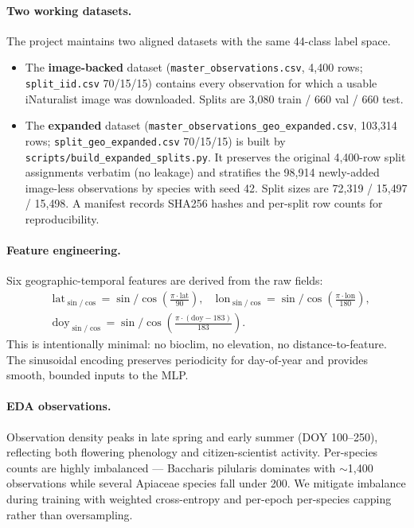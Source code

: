 \documentclass[11pt]{article}
\begin{document}
\paragraph{Two working datasets.} The project maintains two aligned datasets with the same 44-class label space.

\begin{itemize}
    \item The \textbf{image-backed} dataset (\texttt{master\_observations.csv}, 4{,}400 rows; \texttt{split\_iid.csv} 70/15/15) contains every observation for which a usable iNaturalist image was downloaded. Splits are 3{,}080 train / 660 val / 660 test.
    \item The \textbf{expanded} dataset (\texttt{master\_observations\_geo\_expanded.csv}, 103{,}314 rows; \texttt{split\_geo\_expanded.csv} 70/15/15) is built by \texttt{scripts/build\_expanded\_splits.py}. It preserves the original 4{,}400-row split assignments verbatim (no leakage) and stratifies the 98{,}914 newly-added image-less observations by species with seed 42. Split sizes are 72{,}319 / 15{,}497 / 15{,}498. A manifest records SHA256 hashes and per-split row counts for reproducibility.
\end{itemize}

\paragraph{Feature engineering.} Six geographic-temporal features are derived from the raw fields:
\[
\begin{aligned}
&\text{lat}_{\sin/\cos} = \sin/\cos\!\left(\tfrac{\pi \cdot \text{lat}}{90}\right), \quad
\text{lon}_{\sin/\cos} = \sin/\cos\!\left(\tfrac{\pi \cdot \text{lon}}{180}\right),\\
&\text{doy}_{\sin/\cos} = \sin/\cos\!\left(\tfrac{\pi \cdot (\text{doy}-183)}{183}\right).
\end{aligned}
\]
This is intentionally minimal: no bioclim, no elevation, no distance-to-feature. The sinusoidal encoding preserves periodicity for day-of-year and provides smooth, bounded inputs to the MLP.

\paragraph{EDA observations.} Observation density peaks in late spring and early summer (DOY 100--250), reflecting both flowering phenology and citizen-scientist activity. Per-species counts are highly imbalanced --- Baccharis pilularis dominates with $\sim$1{,}400 observations while several Apiaceae species fall under 200. We mitigate imbalance during training with weighted cross-entropy and per-epoch per-species capping rather than oversampling.
\end{document}
